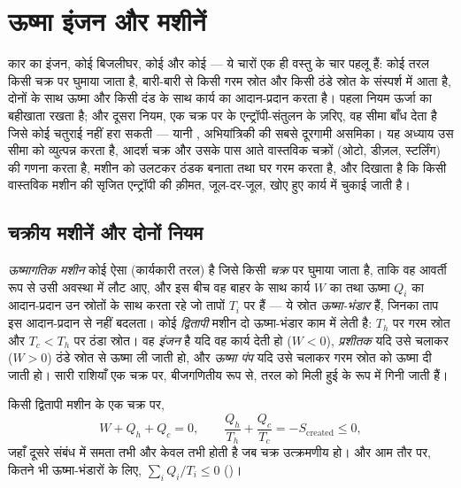 \chapter{ऊष्मा इंजन और मशीनें}\label{ch:b1:heat-engines}

कार का इंजन, कोई बिजलीघर, कोई  और कोई  --- ये चारों एक ही
वस्तु के चार पहलू हैं: कोई तरल किसी चक्र पर घुमाया जाता है, बारी-बारी से
किसी गरम स्रोत और किसी ठंडे स्रोत के संस्पर्श में आता है, दोनों के साथ
ऊष्मा और किसी दंड के साथ कार्य का आदान-प्रदान करता है। पहला नियम ऊर्जा का
बहीखाता रखता है; और दूसरा नियम, एक चक्र पर के एन्ट्रॉपी-संतुलन के ज़रिए, वह
सीमा बाँध देता है जिसे कोई चतुराई नहीं हरा सकती --- यानी ,
अभियांत्रिकी की सबसे दूरगामी असमिका। यह अध्याय उस सीमा को व्युत्पन्न करता
है, आदर्श चक्र और उसके पास आते वास्तविक चक्रों (ओटो, डीज़ल, स्टर्लिंग) की
गणना करता है, मशीन को उलटकर ठंडक बनाता तथा घर गरम करता है, और दिखाता है कि
किसी वास्तविक मशीन की सृजित एन्ट्रॉपी की क़ीमत, जूल-दर-जूल, खोए हुए कार्य
में चुकाई जाती है।

\section{चक्रीय मशीनें और दोनों नियम}

\begin{definition}[ऊष्मागतिक मशीन]\label{def:b1:heat-engines:machine}
\emph{ऊष्मागतिक मशीन} कोई ऐसा  (कार्यकारी तरल) है जिसे किसी
\emph{चक्र} पर घुमाया जाता है, ताकि वह आवर्ती रूप से उसी अवस्था में लौट
आए, और इस बीच वह बाहर के साथ कार्य $W$ का तथा ऊष्मा $Q_i$ का आदान-प्रदान उन
स्रोतों के साथ करता रहे जो तापों $T_i$ पर हैं --- ये स्रोत \emph{ऊष्मा-भंडार} हैं,
जिनका ताप इस आदान-प्रदान से नहीं बदलता। कोई \emph{द्वितापी} मशीन दो
ऊष्मा-भंडार काम में लेती है: $T_h$ पर गरम स्रोत और $T_c < T_h$ पर ठंडा
स्रोत। वह \emph{इंजन} है यदि वह कार्य देती हो ($W < 0$),
\emph{प्रशीतक} यदि उसे चलाकर ($W > 0$) ठंडे स्रोत से ऊष्मा ली जाती हो, और
\emph{ऊष्मा पंप} यदि उसे चलाकर गरम स्रोत को ऊष्मा दी जाती हो। सारी राशियाँ
एक चक्र पर, बीजगणितीय रूप से, तरल को मिली हुई के रूप में गिनी जाती हैं।
\end{definition}

\begin{theorem}[एक चक्र पर दोनों नियम; क्लॉज़ियस असमिका]\label{thm:b1:heat-engines:clausius}
किसी द्वितापी मशीन के एक चक्र पर,
\[
W + Q_h + Q_c = 0 , \qquad
\frac{Q_h}{T_h} + \frac{Q_c}{T_c} = -S_{\mathrm{created}} \leq 0 ,
\]
जहाँ दूसरे संबंध में समता तभी और केवल तभी होती है जब चक्र उत्क्रमणीय हो।
और आम तौर पर, कितने भी ऊष्मा-भंडारों के लिए,
$\sum_i Q_i/T_i \leq 0$ (\emph{})।
\end{theorem}

